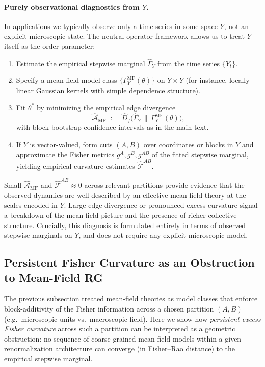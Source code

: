 \documentclass[11pt]{article}
\newcommand{\1}{\mathbf{1}}
\begin{document}
\paragraph{Purely observational diagnostics from $Y$.}
In applications we typically observe only a time series in some space $Y$, not an explicit microscopic state. The neutral operator framework allows us to treat $Y$ itself as the order parameter:
\begin{enumerate}[leftmargin=1.6em]
  \item Estimate the empirical stepwise marginal $\widehat{\Gamma}_Y$ from the time series $\{Y_t\}$.
  \item Specify a mean-field model class $\{\Gamma_Y^{\mathrm{MF}}(\theta)\}$ on $Y\times Y$ (for instance, locally linear Gaussian kernels with simple dependence structure).
  \item Fit $\theta^\ast$ by minimizing the empirical edge divergence
  \[
  \widehat{\mathcal A}_{\mathrm{MF}}
  \;:=\;
  \widehat D_f\!\big(\widehat{\Gamma}_Y \,\big\|\, \Gamma_Y^{\mathrm{MF}}(\theta)\big),
  \]
  with block-bootstrap confidence intervals as in the main text.
  \item If $Y$ is vector-valued, form cuts $(A,B)$ over coordinates or blocks in $Y$ and approximate the Fisher metrics $g^A,g^B,g^{AB}$ of the fitted stepwise marginal, yielding empirical curvature estimates $\widehat{\mathcal F}^{AB}$.
\end{enumerate}
Small $\widehat{\mathcal A}_{\mathrm{MF}}$ and $\widehat{\mathcal F}^{AB}\approx 0$ across relevant partitions provide evidence that the observed dynamics are well-described by an effective mean-field theory at the scales encoded in $Y$. Large edge divergence or pronounced excess curvature signal a breakdown of the mean-field picture and the presence of richer collective structure. Crucially, this diagnosis is formulated entirely in terms of observed stepwise marginals on $Y$, and does not require any explicit microscopic model.


\subsection{Persistent Fisher Curvature as an Obstruction to Mean-Field RG}
\label{sec:mf-obstruction}

The previous subsection treated mean-field theories as model classes that enforce block-additivity of the Fisher information across a chosen partition $(A,B)$ (e.g.\ microscopic units vs.\ macroscopic field). Here we show how \emph{persistent excess Fisher curvature} across such a partition can be interpreted as a geometric obstruction: no sequence of coarse-grained mean-field models within a given renormalization architecture can converge (in Fisher--Rao distance) to the empirical stepwise marginal.
\end{document}
